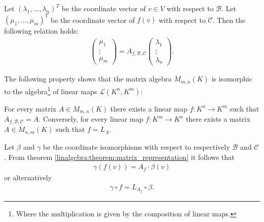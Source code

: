     \begin{property}\label{linalgebra:theorem:matrix_representation}
        Let $(\lambda_1,\ldots,\lambda_n)^T$ be the coordinate vector of $v\in V$ with respect to $\mathcal{B}$. Let $(\mu_1, \ldots, \mu_m)^T$ be the coordinate vector of $f(v)$ with respect to $\mathcal{C}$. Then the following relation holds:
        \begin{gather}
            \left(
            \begin{array}{c}
                \mu_1\\
                \vdots\\
                \mu_m
            \end{array}\right)
            = A_{f, \mathcal{B}, \mathcal{C}}
            \left(
            \begin{array}{c}
                \lambda_1\\
                \vdots\\
                \lambda_n
            \end{array}\right).
        \end{gather}
    \end{property}

    The following property shows that the matrix algebra $M_{m, n}(K)$ is isomorphic to the algebra\footnote{Where the multiplication is given by the composition of linear maps.} of linear maps $\mathcal{L}(K^n, K^m)$:
    \begin{property}\label{linalgebra:theorem:map_matrix_link}
        For every matrix $A\in M_{m,n}(K)$ there exists a linear map $f:K^n\rightarrow K^m$ such that $A_{f, \mathcal{B}, \mathcal{C}} = A$. Conversely, for every linear map $f:K^m\rightarrow K^n$ there exists a matrix $A\in M_{n,m}(K)$ such that $f=L_A$.
    \end{property}
    \begin{property}
        Let $\beta$ and $\gamma$ be the coordinate isomorphisms with respect to respectively $\mathcal{B}$ and $\mathcal{C}$. From theorem \ref{linalgebra:theorem:matrix_representation} it follows that
        \begin{gather}
            \gamma(f(v)) = A_f\cdot\beta(v)
        \end{gather}
        or alternatively
        \begin{gather}
            \gamma\circ f = L_{A_f}\circ\beta.
        \end{gather}
    \end{property}

